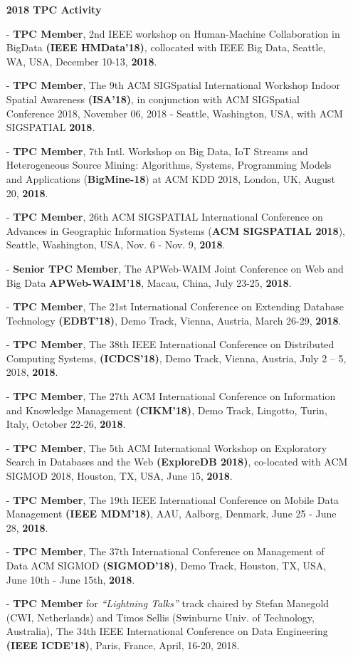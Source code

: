 \documentclass[10pt]{article}
\begin{document}
\begin{itemize}
\begin{itemize}
\vspace{0.1in}
\item[]{\bf 2018 TPC Activity\hrulefill }
%
\item[-] {\bf TPC Member}, 2nd IEEE workshop on Human-Machine Collaboration in BigData {\bf (IEEE HMData'18)}, collocated with IEEE Big Data, Seattle, WA, USA, December 10-13, {\bf 2018}.
\item[-] {\bf TPC Member}, The 9th ACM SIGSpatial International Workshop Indoor Spatial Awareness {\bf (ISA'18)}, in conjunction with ACM SIGSpatial Conference 2018,  November 06, 2018 - Seattle, Washington, USA, with ACM SIGSPATIAL {\bf 2018}.
\item[-] {\bf TPC Member}, 7th Intl. Workshop on Big Data, IoT Streams and Heterogeneous Source Mining: Algorithms, Systems, Programming Models and Applications ({\bf BigMine-18}) at ACM KDD 2018, London, UK, August 20, {\bf 2018}.
\item[-] {\bf TPC Member}, 26th ACM SIGSPATIAL International Conference on Advances in Geographic Information Systems ({\bf ACM SIGSPATIAL 2018}), Seattle, Washington, USA, Nov. 6 - Nov. 9, {\bf 2018}.
\item[-] {\bf Senior TPC Member}, The APWeb-WAIM Joint Conference on Web and Big Data {\bf APWeb-WAIM'18}, Macau, China, July 23-25, {\bf 2018}.
\item[-] {\bf TPC Member}, The 21st International Conference on Extending Database Technology {\bf (EDBT'18)}, Demo Track, Vienna, Austria, March 26-29, {\bf 2018}.
\item[-] {\bf TPC Member}, The 38th IEEE International Conference on Distributed Computing Systems,  {\bf (ICDCS'18)}, Demo Track, Vienna, Austria, July 2 – 5, 2018, {\bf 2018}.
\item[-] {\bf TPC Member}, The 27th ACM International Conference on Information and Knowledge Management   {\bf (CIKM'18)}, Demo Track, Lingotto, Turin, Italy, October 22-26, {\bf 2018}.
\item[-] {\bf TPC Member}, The 5th ACM International Workshop on Exploratory Search in Databases and the Web {\bf (ExploreDB 2018)}, co-located with ACM SIGMOD 2018, Houston, TX, USA, June 15, {\bf 2018}.
\item[-] {\bf TPC Member}, The 19th IEEE International Conference on Mobile Data Management {\bf (IEEE MDM'18)}, AAU, Aalborg, Denmark, June 25 - June 28, {\bf 2018}.
\item[-] {\bf TPC Member}, The 37th International Conference on Management of Data ACM SIGMOD {\bf (SIGMOD'18)}, Demo Track, Houston, TX, USA, June 10th - June 15th, {\bf 2018}.
\item[-] {\bf TPC Member} for {\em ``Lightning Talks''} track chaired by Stefan Manegold (CWI, Netherlands) and Timos Sellis (Swinburne Univ. of Technology, Australia), The 34th IEEE International Conference on Data Engineering {\bf (IEEE ICDE'18)}, Paris, France, April, 16-20, 2018.


\end{itemize}
\end{itemize}
\end{document}

